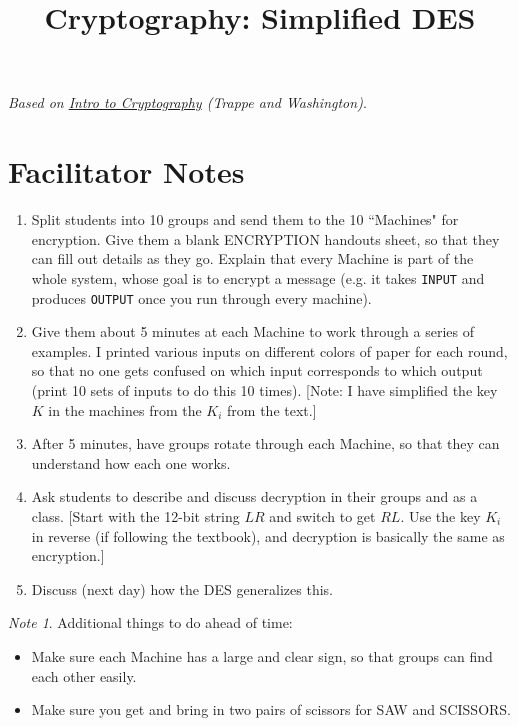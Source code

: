 \documentclass[12pt]{amsart}
\theoremstyle{plain}
\theoremstyle{definition}
\theoremstyle{remark}
\newtheorem*{note}{Note}
\begin{document}
\onehalfspacing

\title[]{Cryptography: Simplified DES}
\maketitle

\begin{center}
\emph{Based on \underline{Intro to Cryptography} (Trappe and Washington)}.
\end{center}

\section{Facilitator Notes}
\begin{enumerate}[1.]
	\item Split students into 10 groups and send them to the 10 ``Machines" for encryption.  Give them a blank ENCRYPTION handouts sheet, so that they can fill out details as they go.  Explain that every Machine is part of the whole system, whose goal is to encrypt a message (e.g. it takes \texttt{INPUT} and produces \texttt{OUTPUT} once you run through every machine).
	\item Give them about 5 minutes at each Machine to work through a series of examples.  I printed various inputs on different colors of paper for each round, so that no one gets confused on which input corresponds to which output (print 10 sets of inputs to do this 10 times).  [Note: I have simplified the key $K$ in the machines from the $K_i$ from the text.]
	\item After 5 minutes, have groups rotate through each Machine, so that they can understand how each one works.
	\item Ask students to describe and discuss decryption in their groups and as a class.  [Start with the 12-bit string $LR$ and switch to get $RL$.  Use the key $K_i$ in reverse (if following the textbook), and decryption is basically the same as encryption.]
	\item Discuss (next day) how the DES generalizes this.
\end{enumerate}

\begin{note}
Additional things to do ahead of time:
\begin{itemize}
	\item Make sure each Machine has a large and clear sign, so that groups can find each other easily.
	\item Make sure you get and bring in two pairs of scissors for SAW and SCISSORS.
\end{itemize}
\end{note}
\end{document}
